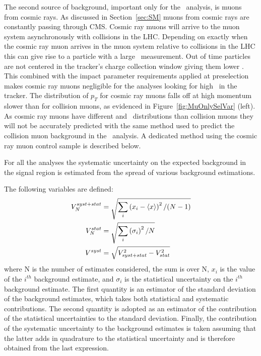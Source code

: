 The second source of background, important only for the \muononly\  analysis,
is muons from cosmic rays. 
As discussed in Section~\ref{sec:SM} muons from cosmic rays
are constantly passing through CMS. Cosmic ray muons will arrive to the muon system asynchronously with collisions in the LHC. Depending on exactly
when the cosmic ray muon arrives in the muon system relative to collisions in the LHC this can give rise to a particle with a large \invbeta\ measurement.
Out of time particles are not centered in the tracker's charge collection window giving them lower \dedx. This combined
with the impact parameter requirements applied at preselection makes cosmic ray muons negligible for the analyses looking for high \dedx\ in the tracker.
The distribution of $p_T$ for cosmic ray muons falls off at high momentum slower than for collision muons, as evidenced in Figure~\ref{fig:MuOnlySelVar} (left).
As cosmic ray muons have different \invbeta and \pt\ distributions than collision muons they will not be accurately predicted with the same method used to predict
the collision muon background in the \muononly\ analysis. A dedicated method using the cosmic ray muon control sample is described below.

For all the analyses the systematic uncertainty on the expected background in the signal
region is estimated from the spread of various background estimations.

The following variables are defined:
\begin{equation}
\centering
\begin{split}
V^{syst+stat}_{N} &= \sqrt{\sum_i \left( x_i - \langle x \rangle  \right) ^2/(N-1)} \\
V^{stat}_{N} &= \sqrt{\sum_i \left( \sigma _i \right) ^2/N} \\
V^{syst} &= \sqrt{V_{syst+stat}^2-V_{stat}^2} \\
\end{split}
\label{eq:variance}
\end{equation}
where N is the number of estimates considered,
the sum is over N, $x_i$ is the value of the $i^{th}$ background estimate,
and $\sigma_i$ is the statistical uncertainty on
the $i^{th}$ background estimate. The first quantity is an estimator of the
standard deviation of the background estimates, which takes both statistical
and systematic contributions. The second quantity is adopted as an
estimator of the contribution of the statistical uncertainties
to the standard deviation. Finally, the contribution of the
systematic uncertainty to the background estimates is taken assuming
that the latter adds in quadrature to the statistical uncertainty and
is therefore obtained from the last expression.

